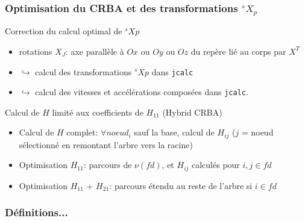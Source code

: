 \documentclass[10pt]{beamer}
\begin{document}
\begin{frame}
  \frametitle{Optimisation du CRBA et des transformations $^sX_p$}
  
  \begin{block}{Correction du calcul optimal de $^sXp$}
  \begin{itemize}
	  \item rotations $X_J$: axe parallèle à $Ox$ ou $Oy$ ou $Oz$ du repère lié au corps par $X^T$
	  \item $\hookrightarrow$ calcul des transformations $^sXp$ dans \verb;jcalc;
	  \item $\hookrightarrow$ calcul des vitesses et accélérations composées dans \verb;jcalc;.
  \end{itemize}
  \end{block}
  
  \begin{block}{Calcul de $H$ limité aux coefficients de $H_{11}$ (Hybrid CRBA)}
  \begin{itemize}
    \item Calcul de $H$ complet: $\forall noeud_i$ sauf la base, calcul de $H_{ij}$ ($j$ = noeud sélectionné en remontant l'arbre vers la racine)
	  \item Optimisation $H_{11}$: parcours de $\nu(fd)$, et $H_{ij}$ calculés pour $i,j \in fd$
	  \item Optimisation $H_{11}$ + $H_{21}$: parcours étendu au reste de l'arbre si $i \in fd$
  \end{itemize}
	\end{block}    
  
\end{frame}


\begin{frame}
  \frametitle{Définitions...}
  
  	\begin{columns}
	\begin{column}{.48\textwidth}
   \vfill
  \end{column}
  \begin{column}{.48\textwidth}
  \vfill {}
  \end{column}
  \end{columns}
  
\end{frame}
\end{document}
